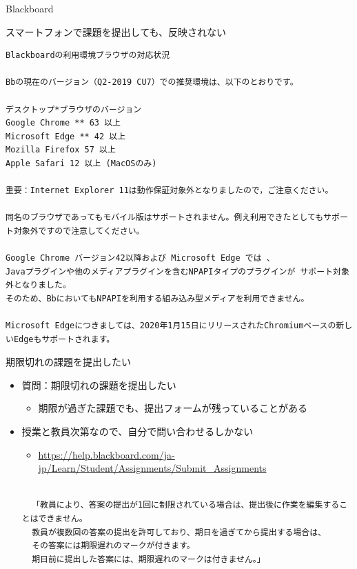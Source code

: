 \documentclass[a4j,10pt]{jsarticle}
\begin{document}
{\begin{frame}[label={sec:orgc119bb0},fragile]{Blackboard}
\begin{block}{スマートフォンで課題を提出しても、反映されない}
\begin{verbatim}
Blackboardの利用環境ブラウザの対応状況

Bbの現在のバージョン（Q2-2019 CU7）での推奨環境は、以下のとおりです。

デスクトップ*ブラウザのバージョン
Google Chrome ** 63 以上
Microsoft Edge ** 42 以上
Mozilla Firefox 57 以上
Apple Safari 12 以上 (MacOSのみ)

重要：Internet Explorer 11は動作保証対象外となりましたので，ご注意ください。

同名のブラウザであってもモバイル版はサポートされません。例え利用できたとしてもサポート対象外ですので注意してください。

Google Chrome バージョン42以降および Microsoft Edge では 、
Javaプラグインや他のメディアプラグインを含むNPAPIタイプのプラグインが サポート対象外となりました。
そのため、BbにおいてもNPAPIを利用する組み込み型メディアを利用できません。

Microsoft Edgeにつきましては、2020年1月15日にリリースされたChromiumベースの新しいEdgeもサポートされます。\end{verbatim}

\end{block}
\par
\begin{block}{期限切れの課題を提出したい}
\begin{itemize}
\item 質問：期限切れの課題を提出したい
\begin{itemize}
\item 期限が過ぎた課題でも、提出フォームが残っていることがある
\end{itemize}
\par
\item 授業と教員次第なので、自分で問い合わせるしかない
\begin{itemize}
\item \url{https://help.blackboard.com/ja-jp/Learn/Student/Assignments/Submit\_Assignments}
\end{itemize}
\par
\begin{verbatim}

  「教員により、答案の提出が1回に制限されている場合は、提出後に作業を編集することはできません。
  教員が複数回の答案の提出を許可しており、期日を過ぎてから提出する場合は、
  その答案には期限遅れのマークが付きます。
  期日前に提出した答案には、期限遅れのマークは付きません。」\end{verbatim}


\end{itemize}
\end{block}
\end{frame}}
\end{document}
